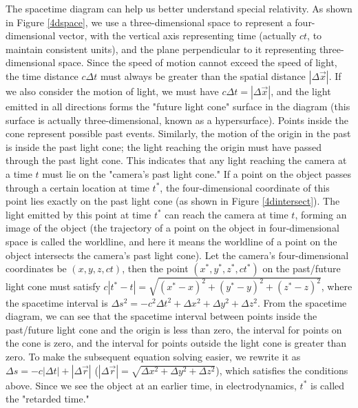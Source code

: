 \documentclass{article}
\begin{document}
The spacetime diagram can help us better understand special relativity. As shown in Figure \ref{4dspace}, we use a three-dimensional space to represent a four-dimensional vector, with the vertical axis representing time (actually $ct$, to maintain consistent units), and the plane perpendicular to it representing three-dimensional space. Since the speed of motion cannot exceed the speed of light, the time distance $c\Delta t$ must always be greater than the spatial distance $|\Delta \vec{x}|$. If we also consider the motion of light, we must have $c\Delta t = |\Delta \vec{x}|$, and the light emitted in all directions forms the "future light cone" surface in the diagram (this surface is actually three-dimensional, known as a hypersurface). Points inside the cone represent possible past events. Similarly, the motion of the origin in the past is inside the past light cone; the light reaching the origin must have passed through the past light cone. This indicates that any light reaching the camera at a time $t$ must lie on the "camera's past light cone." If a point on the object passes through a certain location at time $t^{*}$, the four-dimensional coordinate of this point lies exactly on the past light cone (as shown in Figure \ref{4dintersect}). The light emitted by this point at time $t^{*}$ can reach the camera at time $t$, forming an image of the object (the trajectory of a point on the object in four-dimensional space is called the worldline, and here it means the worldline of a point on the object intersects the camera's past light cone). Let the camera's four-dimensional coordinates be $(x, y, z, ct)$, then the point $(x^{*}, y^{*}, z^{*}, ct^{*})$ on the past/future light cone must satisfy $c|t^{*} - t| = \sqrt{(x^{*} - x)^2 + (y^{*} - y)^2 + (z^{*} - z)^2}$, where the spacetime interval is $\Delta s^2 = -c^2\Delta t^2 + \Delta x^2 + \Delta y^2 + \Delta z^2$. From the spacetime diagram, we can see that the spacetime interval between points inside the past/future light cone and the origin is less than zero, the interval for points on the cone is zero, and the interval for points outside the light cone is greater than zero. To make the subsequent equation solving easier, we rewrite it as $\Delta s = -c|\Delta t| + |\Delta \vec{r}|$ ($|\Delta \vec{r}| = \sqrt{\Delta x^2 + \Delta y^2 + \Delta z^2}$), which satisfies the conditions above. Since we see the object at an earlier time, in electrodynamics, $t^{*}$ is called the "retarded time."
\end{document}
